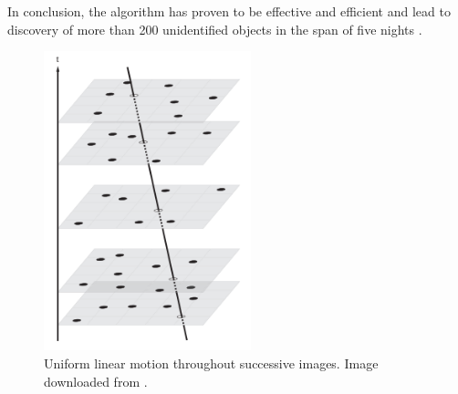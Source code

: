 	In conclusion, the algorithm has proven to be effective and efficient and lead to discovery of more than 200 unidentified objects in the span of five nights \citep{oda}.

	\begin{figure}[H]
	\centering
	  \includegraphics[width=6cm]{images/uniform_linear_motion}
		  \caption{Uniform linear motion throughout successive images. Image downloaded from \citep{oda}.}
	  \label{fig:u_l_m}
	\end{figure}